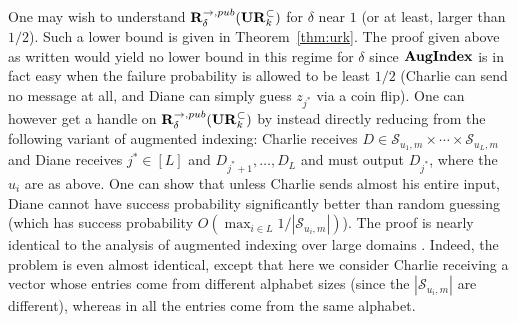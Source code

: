 \begin{remark}
\textup{
One may wish to understand $\mathbf{R}^{\rightarrow,pub}_\delta(\mathbf{UR}_k^\subset)$ for $\delta$ near $1$ (or at least, larger than $1/2$). Such a lower bound is given in Theorem~\ref{thm:urk}. The proof given above as written would yield no lower bound in this regime for $\delta$ since $\mathbf{AugIndex}$ is in fact easy when the failure probability is allowed to be least $1/2$ (Charlie can send no message at all, and Diane can simply guess $z_{j^*}$ via a coin flip). One can however get a handle on $\mathbf{R}^{\rightarrow,pub}_\delta(\mathbf{UR}_k^\subset)$ by instead directly reducing from the following variant of augmented indexing: Charlie receives $D\in \mathcal S_{u_1,m}\times \cdots \times \mathcal S_{u_L, m}$ and Diane receives $j^*\in[L]$ and $D_{j^*+1},\ldots,D_L$ and must output $D_{j^*}$, where the $u_i$ are as above. One can show that unless Charlie sends almost his entire input, Diane cannot have success probability significantly better than random guessing (which has success probability $O(\max_{i\in L} 1/|\mathcal S_{u_i, m}|)$). The proof is nearly identical to the analysis of augmented indexing over large domains \cite{ErgunJS10,JayramW13}. Indeed, the problem is even almost identical, except that here we consider Charlie receiving a vector whose entries come from different alphabet sizes (since the $|\mathcal S_{u_i,m}|$ are different), whereas in \cite{ErgunJS10,JayramW13} all the entries come from the same alphabet.
}
\end{remark}